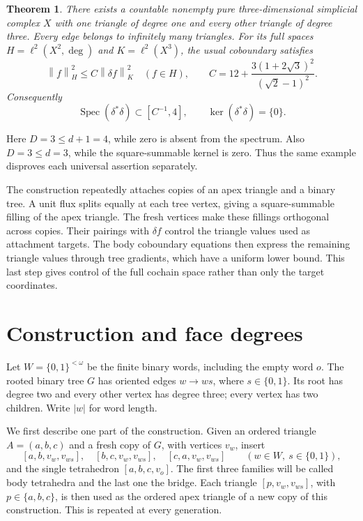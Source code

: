 \documentclass[11pt]{article}
\newtheorem{theorem}{Theorem}
\newcommand{\Spec}{\operatorname{Spec}}
\newcommand{\degf}{\operatorname{deg}}
\newcommand{\norm}[1]{\left\lVert#1\right\rVert}
\begin{document}
\begin{theorem}\label{thm:main}
There exists a countable nonempty pure three-dimensional simplicial complex
$X$ with one triangle of degree one and every other triangle of degree three.
Every edge belongs to infinitely many triangles. For its full spaces
$H=\ell^2(X^2,\degf)$ and $K=\ell^2(X^3)$, the usual coboundary satisfies
\[
 \norm{f}_H^2\leq C\norm{\delta f}_K^2\quad(f\in H),\qquad
 C=12+\frac{3(1+2\sqrt3)^2}{(\sqrt2-1)^2}.
\]
Consequently
\[
 \Spec(\delta^*\delta)\subset[C^{-1},4],\qquad
 \ker(\delta^*\delta)=\{0\}.
\]
\end{theorem}

Here $D=3\leq d+1=4$, while zero is absent from the spectrum. Also
$D=3\leq d=3$, while the square-summable kernel is zero. Thus the same
example disproves each universal assertion separately.

The construction repeatedly attaches copies of an apex triangle and a
binary tree. A unit flux splits equally at each tree vertex, giving a
square-summable filling of the apex triangle. The fresh vertices make these
fillings orthogonal across copies. Their pairings with $\delta f$ control
the triangle values used as attachment targets. The body coboundary equations
then express the remaining triangle values through tree gradients, which
have a uniform lower bound. This last step gives control of the full cochain
space rather than only the target coordinates.

\section{Construction and face degrees}\label{sec:construction}

Let $W=\{0,1\}^{<\omega}$ be the finite binary words, including the empty
word $o$. The rooted binary tree $G$ has oriented edges $w\to ws$, where
$s\in\{0,1\}$. Its root has degree two and every other vertex has degree
three; every vertex has two children. Write $|w|$ for word length.

We first describe one part of the construction. Given an ordered triangle
$A=(a,b,c)$ and a fresh copy of $G$, with vertices $v_w$, insert
\begin{equation}\label{eq:tetrahedra}
 [a,b,v_w,v_{ws}],\quad [b,c,v_w,v_{ws}],\quad
 [c,a,v_w,v_{ws}]
 \qquad(w\in W,\ s\in\{0,1\}),
\end{equation}
and the single tetrahedron $[a,b,c,v_o]$. The first three families will be
called body tetrahedra and the last one the bridge. Each triangle
$[p,v_w,v_{ws}]$, with $p\in\{a,b,c\}$, is then used as the ordered apex
triangle of a new copy of this construction. This is repeated at every
generation.
\end{document}
